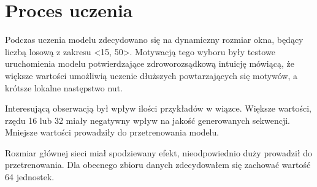 {    \section{Proces uczenia}
    {
        Podczas uczenia modelu zdecydowano się na dynamiczny rozmiar okna,
        będący liczbą losową z zakresu <15, 50>. Motywacją tego wyboru były testowe 
        uruchomienia modelu potwierdzające zdroworozsądkową intuicję mówiącą, że większe wartości
        umożliwią uczenie dłuższych powtarzających się motywów, a krótsze lokalne następstwo nut.

        Interesującą obserwacją był wpływ ilości przykładów w wiązce. Większe wartości, rzędu 16 lub 32
        miały negatywny wpływ na jakość generowanych sekwencji. Mniejsze wartości prowadziły do przetrenowania
        modelu.

        Rozmiar głównej sieci miał spodziewany efekt, nieodpowiednio duży prowadził do przetrenowania. Dla obecnego
        zbioru danych zdecydowałem się zachować wartość 64 jednostek.


    }
}